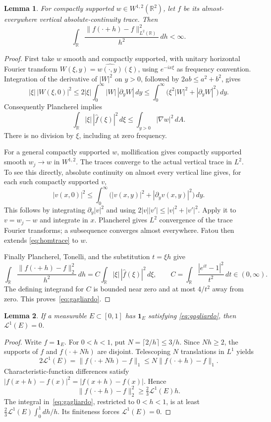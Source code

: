 \documentclass[11pt]{article}
\newtheorem{lemma}{Lemma}
\newcommand{\R}{\mathbb R}
\newcommand{\ind}{\mathbf 1}
\newcommand{\length}{\mathcal L^1}
\begin{document}
\begin{lemma}\label{lem:trace}
For compactly supported $w\in W^{1,2}(\R^2)$, let $f$ be its almost-everywhere
vertical absolute-continuity trace. Then
\begin{equation}\label{eq:gagliardo}
 \int_\R\frac{\|f(\cdot+h)-f\|_{L^2(\R)}^2}{h^2}\,dh<\infty.
\end{equation}
\end{lemma}
\begin{proof}
First take $w$ smooth and compactly supported, with unitary horizontal
Fourier transform $W(\xi,y)=\widehat{w(\cdot,y)}(\xi)$, using
$e^{-ix\xi}$ as frequency convention. Integration of the derivative of
$|W|^2$ on $y>0$, followed by $2ab\leq a^2+b^2$, gives
\[
 |\xi|\,|W(\xi,0)|^2
 \leq2|\xi|\int_0^\infty|W|\,|\partial_yW|\,dy
 \leq\int_0^\infty\bigl(\xi^2|W|^2+|\partial_yW|^2\bigr)\,dy.
\]
Consequently Plancherel implies
\begin{equation}\label{eq:homtrace}
 \int_\R|\xi|\,|\widehat f(\xi)|^2\,d\xi
 \leq\int_{y>0}|\nabla w|^2\,dA.
\end{equation}
There is no division by $\xi$, including at zero frequency.

For a general compactly supported $w$, mollification gives compactly
supported smooth $w_j\to w$ in $W^{1,2}$. The traces converge to the actual
vertical trace in $L^2$. To see this directly, absolute continuity on almost
every vertical line gives, for each such compactly supported $v$,
\[
 |v(x,0)|^2\leq
 \int_0^\infty\bigl(|v(x,y)|^2+|\partial_yv(x,y)|^2\bigr)\,dy.
\]
This follows by integrating $\partial_y|v|^2$ and using $2|v||v'|\leq
|v|^2+|v'|^2$. Apply it to $v=w_j-w$ and integrate in $x$.
Plancherel gives $L^2$ convergence of the trace Fourier transforms; a
subsequence converges almost everywhere. Fatou then extends
\eqref{eq:homtrace} to $w$.

Finally Plancherel, Tonelli, and the substitution $t=\xi h$ give
\[
 \int_\R\frac{\|f(\cdot+h)-f\|_2^2}{h^2}\,dh
 =C\int_\R|\xi|\,|\widehat f(\xi)|^2\,d\xi,
 \qquad
 C=\int_\R\frac{|e^{it}-1|^2}{t^2}\,dt\in(0,\infty).
\]
The defining integrand for $C$ is bounded near zero and at most $4/t^2$
away from zero. This proves~\eqref{eq:gagliardo}.
\end{proof}

\begin{lemma}\label{lem:rigidity}
If a measurable $E\subset[0,1]$ has $\ind_E$ satisfying
\eqref{eq:gagliardo}, then $\length(E)=0$.
\end{lemma}
\begin{proof}
Write $f=\ind_E$. For $0<h<1$, put $N=\lceil2/h\rceil\leq3/h$.
Since $Nh\geq2$, the supports of $f$ and $f(\cdot+Nh)$ are disjoint.
Telescoping $N$ translations in $L^1$ yields
\[
 2\length(E)=\|f(\cdot+Nh)-f\|_1
 \leq N\|f(\cdot+h)-f\|_1.
\]
Characteristic-function differences satisfy $|f(x+h)-f(x)|^2=
|f(x+h)-f(x)|$. Hence
\[
 \|f(\cdot+h)-f\|_2^2\geq\tfrac23\length(E)h.
\]
The integral in~\eqref{eq:gagliardo}, restricted to $0<h<1$, is at least
$\frac23\length(E)\int_0^1dh/h$. Its finiteness forces $\length(E)=0$.
\end{proof}
\end{document}
